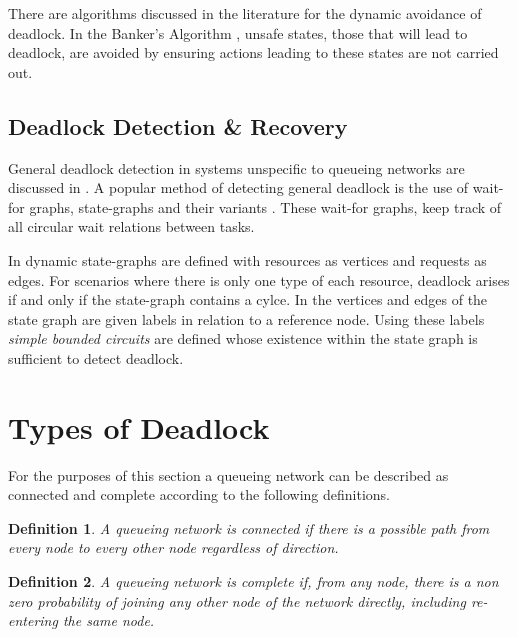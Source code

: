 \documentclass{article}
\newtheorem{definition}{Definition}
\begin{document}
There are algorithms discussed in the literature for the dynamic avoidance of deadlock.
In the Banker's Algorithm \cite{dijkstra82, kawadkaretal14}, unsafe states, those that will lead to deadlock, are avoided by ensuring actions leading to these states are not carried out.

\subsection{Deadlock Detection \& Recovery}

General deadlock detection in systems unspecific to queueing networks are discussed in \cite{coffmanelphick71}.
A popular method of detecting general deadlock is the use of wait-for graphs, state-graphs and their variants \cite{cheng90, elmagarmid86, coffmanelphick71, choetal95}.
These wait-for graphs, keep track of all circular wait relations between tasks.

In \cite{coffmanelphick71} dynamic state-graphs are defined with resources as vertices and requests as edges.
For scenarios where there is only one type of each resource, deadlock arises if and only if the state-graph contains a cylce.
In \cite{choetal95} the vertices and edges of the state graph are given labels in relation to a reference node.
Using these labels \textit{simple bounded circuits} are defined whose existence within the state graph is sufficient to detect deadlock.

\section{Types of Deadlock}\label{sec:typesofdeadlock}
For the purposes of this section a queueing network can be described as connected and complete according to the following definitions.\\

\begin{definition}
A queueing network is connected if there is a possible path from every node to every other node regardless of direction.\\
\end{definition}

\begin{definition}
A queueing network is complete if, from any node, there is a non zero probability of joining any other node of the network directly, including re-entering the same node.\\
\end{definition}
\end{document}
